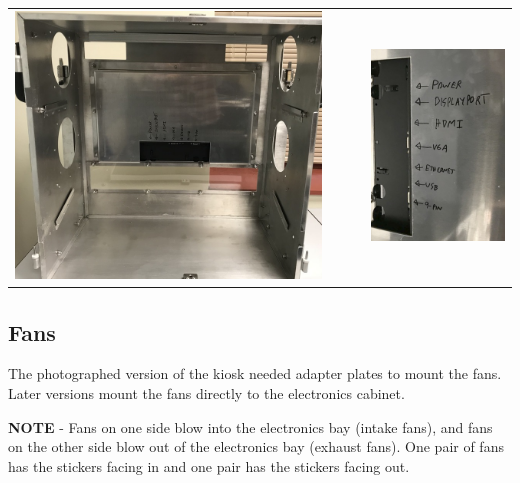\begin{tabular}{ccc}
\includegraphics[height=0.45\columnwidth]
{photos/install-20181106/ts-installed.jpg} &
~~~ &
\includegraphics[height=0.45\columnwidth]
{photos/install-20181106/ts-labels.jpg} \\
\end{tabular}

%
%
\clearpage
\subsection{Fans}
\label{sect-setup-howto-fans}

The photographed version of the kiosk needed adapter plates to mount the
fans. Later versions mount the fans directly to the electronics cabinet.

\textbf{NOTE} - Fans on one side blow into the electronics bay (intake fans),
and fans on the other side blow out of the electronics bay (exhaust fans).
One pair of fans has the stickers facing in and one pair has the stickers
facing out.

